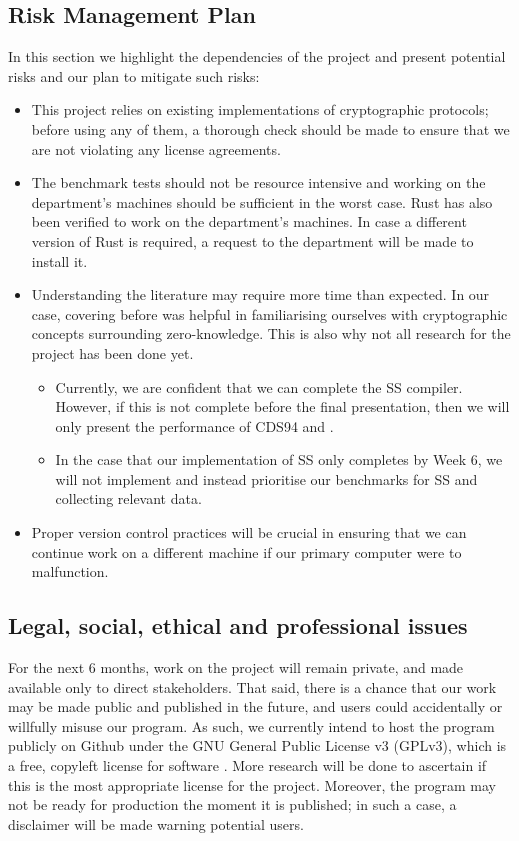 \subsection{Risk Management Plan}
In this section we highlight the dependencies of the project and present potential risks and our plan to mitigate such risks:
\begin{itemize}
    \item This project relies on existing implementations of cryptographic protocols; before using any of them, a thorough check should be made to ensure that we are not violating any license agreements.
    \item The benchmark tests should not be resource intensive and working on the department's machines should be sufficient in the worst case. Rust has also been verified to work on the department's machines. In case a different version of Rust is required, a request to the department will be made to install it. 
    \item Understanding the literature may require more time than expected. In our case, covering \cite{CDS94} before \cite{StackingSigmas} was helpful in familiarising ourselves with cryptographic concepts surrounding zero-knowledge. This is also why not all research for the project has been done yet. 
    \begin{itemize}
        \item Currently, we are confident that we can complete the SS compiler. However, if this is not complete before the final presentation, then we will only present the performance of CDS94 and \cite{MHAStackSig}.
        \item In the case that our implementation of SS only completes by Week 6, we will not implement \cite{SpeedStacking} and instead prioritise our benchmarks for SS and collecting relevant data.
    \end{itemize}
    \item Proper version control practices will be crucial in ensuring that we can continue work on a different machine if our primary computer were to malfunction.
\end{itemize}

\subsection{Legal, social, ethical and professional issues}

For the next 6 months, work on the project will remain private, and made available only to direct stakeholders. That said, there is a chance that our work may be made public and published in the future, and users could accidentally or willfully misuse our program. As such, we currently intend to host the program publicly on Github under the GNU General Public License v3 (GPLv3), which is a free, copyleft license for software \cite{GPLv3}. More research will be done to ascertain if this is the most appropriate license for the project. Moreover, the program may not be ready for production the moment it is published; in such a case, a disclaimer will be made warning potential users.

